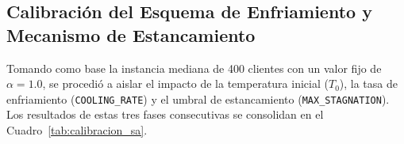 \documentclass[letter, 10pt, dvipdfmx]{article}
\begin{document}
\subsection{Calibración del Esquema de Enfriamiento y Mecanismo de Estancamiento}
Tomando como base la instancia mediana de 400 clientes con un valor fijo de $\alpha = 1.0$, se procedió a aislar el impacto de la temperatura inicial ($T_0$), la tasa de enfriamiento (\texttt{COOLING\_RATE}) y el umbral de estancamiento (\texttt{MAX\_STAGNATION}). Los resultados de estas tres fases consecutivas se consolidan en el Cuadro~\ref{tab:calibracion_sa}.

\vspace{-5mm}

\begin{table}[htbp]
\centering
\caption{Resultados detallados del proceso secuencial de sintonización para la instancia de 400 clientes ($\alpha=1.0$).}
\label{tab:calibracion_sa}
\scriptsize
\setlength{\tabcolsep}{4pt}



\end{table}
\end{document}
